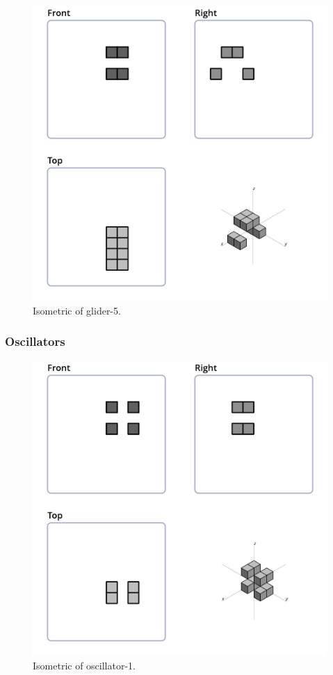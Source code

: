 \begin{figure}
  \centering
  \includegraphics[scale=0.4]{iso_settings/glider_5.png}
  \caption{Isometric of glider-5.}
  \label{fig:iso-glider-5}
\end{figure}

\subsubsection{Oscillators}

\begin{figure}
	\centering
	\includegraphics[scale=0.4]{iso_settings/osc_1.png}
	\caption{Isometric of oscillator-1.}
  \label{fig:iso-osc-1}
\end{figure}

